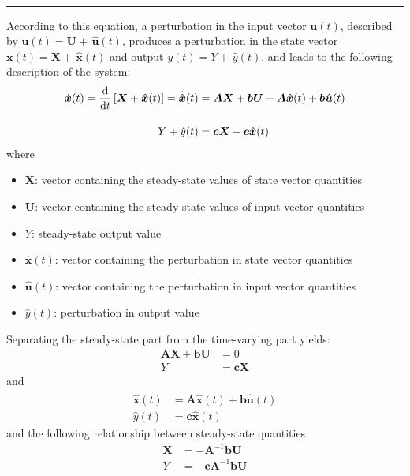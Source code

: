 ~\rule{\textwidth}{0.5pt}
According to this equation, a perturbation in the input vector $\boldsymbol{u}(t)$, described by $\boldsymbol{u}(t) = \boldsymbol{U} + \, \hat{\boldsymbol{u}}(t)$, produces a perturbation in the state vector $\boldsymbol{x}(t) = \boldsymbol{X} + \, \hat{\boldsymbol{x}}(t)$ and output $y(t) = Y + \, \hat{y}(t)$, and leads to the following description of the system:
\begin{align*}
\dot{\boldsymbol{x}}(t) = \frac{\mathrm{d}}{\mathrm{d} t} \left[\boldsymbol{X} + \hat{\boldsymbol{x}}(t)\right] = \dot{\hat{\boldsymbol{x}}}(t)
&=
\boldsymbol{A} \boldsymbol{X} + \boldsymbol{b} \boldsymbol{U} + \boldsymbol{A} \hat{\boldsymbol{x}}(t) + \boldsymbol{b} \hat{\boldsymbol{u}}(t)
\\[11pt]
Y + \hat{y}(t) &= \boldsymbol{c} \boldsymbol{X} + \boldsymbol{c} \hat{\boldsymbol{x}}(t)
\end{align*}
where
\begin{itemize}
\item $\boldsymbol{X}$: vector containing the steady-state values of state vector quantities
\item $\boldsymbol{U}$: vector containing the steady-state values of input vector quantities
\item $Y$: steady-state output value
\item $\hat{\boldsymbol{x}}(t)$: vector containing the perturbation in state vector quantities
\item $\hat{\boldsymbol{u}}(t)$: vector containing the perturbation in input vector quantities
\item $\hat{y}(t)$: perturbation in output value
\end{itemize}
\iffalse
Separating the steady-state part from the time-varying part yields:
\begin{align*}
\boldsymbol{A} \boldsymbol{X} + \boldsymbol{b} \boldsymbol{U} &= 0
\\[11pt]
Y &= \boldsymbol{c} \boldsymbol{X}
\end{align*}
and
\begin{align*}
\dot{\hat{\boldsymbol{x}}}(t) &= \boldsymbol{A} \hat{\boldsymbol{x}}(t) + \boldsymbol{b} \hat{\boldsymbol{u}}(t)
\\[11pt]
\hat{y}(t) &= \boldsymbol{c} \hat{\boldsymbol{x}}(t)
\end{align*}
and the following relationship between steady-state quantities:
\begin{align*}
\boldsymbol{X} &= \minus \boldsymbol{A}^{-1} \boldsymbol{b} \boldsymbol{U}
\\[11pt]
Y &= \minus \boldsymbol{c} \boldsymbol{A}^{-1} \boldsymbol{b} \boldsymbol{U}
\end{align*}
